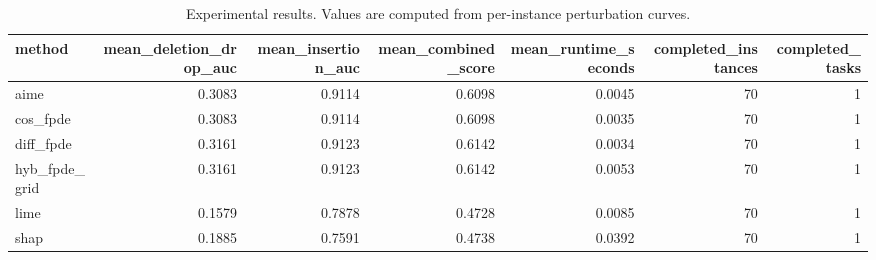 \begin{table}[t]
\caption{Experimental results. Values are computed from per-instance perturbation curves.}
\label{tab:main_results_computed}
\centering
\begin{tabular}{lrrrrrr}
\toprule
method & mean\_deletion\_drop\_auc & mean\_insertion\_auc & mean\_combined\_score & mean\_runtime\_seconds & completed\_instances & completed\_tasks \\
\midrule
aime & 0.3083 & 0.9114 & 0.6098 & 0.0045 & 70 & 1 \\
cos\_fpde & 0.3083 & 0.9114 & 0.6098 & 0.0035 & 70 & 1 \\
diff\_fpde & 0.3161 & 0.9123 & 0.6142 & 0.0034 & 70 & 1 \\
hyb\_fpde\_grid & 0.3161 & 0.9123 & 0.6142 & 0.0053 & 70 & 1 \\
lime & 0.1579 & 0.7878 & 0.4728 & 0.0085 & 70 & 1 \\
shap & 0.1885 & 0.7591 & 0.4738 & 0.0392 & 70 & 1 \\
\bottomrule
\end{tabular}

\end{table}
